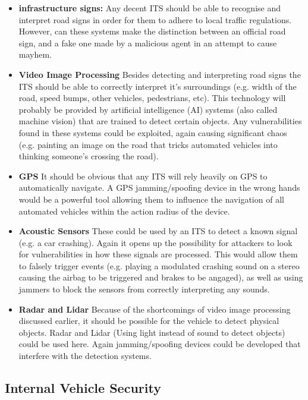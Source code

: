 \documentclass[11pt]{article}
\begin{document}
\begin{itemize}
	\item \textbf{infrastructure signs:} Any decent ITS should be able to recognise and interpret road signs in order for them to adhere to local traffic regulations. However, can these systems make the distinction between an official road sign, and a fake one made by a malicious agent in an attempt to cause mayhem.\cite{Petit}
	
	\item \textbf{Video Image Processing} Besides detecting and interpreting road signs the ITS should be able to correctly interpret it's surroundings (e.g. width of the road, speed bumps, other vehicles, pedestrians, etc). This technology will probably be provided by artificial intelligence (AI) systems (also called machine vision) that are trained to detect certain objects. Any vulnerabilities found in these systems could be exploited, again causing significant chaos (e.g. painting an image on the road that tricks automated vehicles into thinking someone's crossing the road).\cite{Petit}
	
	\item \textbf{GPS} It should be obvious that any ITS will rely heavily on GPS to automatically navigate. A GPS jamming/spoofing device in the wrong hands would be a powerful tool allowing them to influence the navigation of all automated vehicles within the action radius of the device.\cite{Petit}
	
	\item \textbf{Acoustic Sensors} These could be used by an ITS to detect a known signal (e.g. a car crashing). Again it opens up the possibility for attackers to look for vulnerabilities in how these signals are processed. This would allow them to falsely trigger events (e.g. playing a modulated crashing sound on a stereo causing the airbag to be triggered and brakes to be angaged), as well as using jammers to block the sensors from correctly interpreting any sounds.\cite{Petit}
	
	\item \textbf{Radar and Lidar} Because of the shortcomings of video image processing discussed earlier, it should be possible for the vehicle to detect physical objects. Radar and Lidar (Using light instead of sound to detect objects) could be used here. Again jamming/spoofing devices could be developed that interfere with the detection systems.\cite{Petit}
\end{itemize}

\subsection{Internal Vehicle Security}
\end{document}
